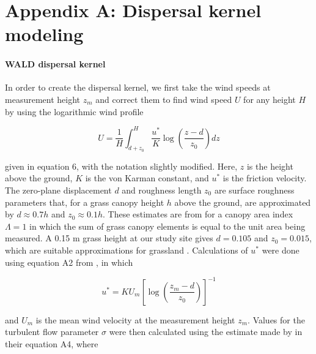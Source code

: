 \documentclass[11pt]{article}\usepackage[]{graphicx}\usepackage[usenames,dvipsnames]{xcolor}
\begin{document}
\newpage
\section*{Appendix A: Dispersal kernel modeling}
\renewcommand{\thefigure}{A\arabic{figure}}\setcounter{figure}{0}
\renewcommand{\thetable}{A\arabic{table}}\setcounter{table}{0}
\renewcommand{\theequation}{A\arabic{equation}}\setcounter{equation}{0}

\paragraph{WALD dispersal kernel}
In order to create the dispersal kernel, we first take the wind speeds at measurement height $z_{m}$ and correct them to find wind speed $U$ for any height $H$ by using the logarithmic wind profile

\begin{linenomath*} \begin{equation} U = \frac{1}{H} \int_{d+z_{0}}^{H} \frac{u^*}{K} \log \left(\frac{z-d}{z_{0}}\right) dz \end{equation} 
\end{linenomath*} 

given in \citet{bullock2012modelling} equation 6, with the notation slightly modified. 
Here, $z$ is the height above the ground, $K$ is the von Karman constant, and $u^*$ is the friction velocity.
The zero-plane displacement $d$ and roughness length $z_{0}$ are surface roughness parameters that, for a grass canopy height $h$ above the ground, are  approximated by $d \approx 0.7h$ and $z_{0} \approx 0.1h$.
These estimates are from \citet{raupach1994simplified} for a canopy area index $\Lambda = 1$ in which the sum of grass canopy elements is equal to the unit area being measured.
A 0.15 m grass height at our study site gives $d = 0.105$ and $z_{0} = 0.015$, which are suitable approximations for grassland \citep{wiernga1993representative}.
Calculations of $u^*$ were done using equation A2 from \citet{skarpaas2007dispersal}, in which 

\begin{linenomath*} \begin{equation} u^* = KU_{m} \left[\log\left(\frac{z_{m} - d}{z_{0}}\right)\right]^{-1} \end{equation} 
\end{linenomath*} 

and $U_{m}$ is the mean wind velocity at the measurement height $z_{m}$.
Values for the turbulent flow parameter $\sigma$ were then calculated using the estimate made by \citet{skarpaas2007dispersal} in their equation A4, where 
\end{document}
